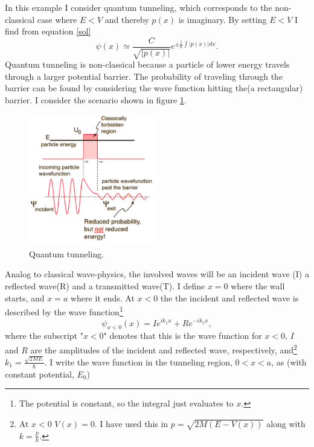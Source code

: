 \begin{example}
	In this example I consider quantum tunneling, which corresponds to the non-classical case where $E<V$ and thereby $p(x)$ is imaginary. By setting $E<V$ I find from equation \eqref{sol}
	\begin{equation}
		\psi(x)\simeq\frac{C}{\sqrt{|p(x)|}}e^{\pm\frac{1}{\hbar}\int |p(x)|dx}.
		\label{sol7}
	\end{equation} 
	Quantum tunneling is non-classical because a particle of lower energy travels through a larger potential barrier. The probability of traveling through the barrier can be found by considering the wave function hitting the(a rectangular) barrier. I consider the scenario shown in figure \ref{fig:wkb2}.
	\begin{figure}[H]
		\captionsetup{width=1\textwidth}
		\centering
		\includegraphics[width=0.5\textwidth]{figures/wkb2}
		\caption{Quantum tunneling.}
		\label{fig:wkb2}
	\end{figure}
	Analog to classical wave-physics, the involved waves will be an incident wave (I) a reflected wave(R) and a transmitted wave(T). I define $x=0$ where the wall starts, and $x=a$ where it ends. At $x<0$ the the incident and reflected wave is described by the wave function\footnote{The potential is constant, so the integral just evaluates to $x$.}
	\begin{equation}
		\psi_{x<0}(x)=Ie^{ik_1x}+Re^{-ik_1x},
	\end{equation} 
	where the subscript "$x<0$" denotes that this is the wave function for $x<0$, $I$ and $R$ are the amplitudes of the incident and reflected wave, respectively, and\footnote{At $x<0$ $V(x)=0$. I have used this in $p=\sqrt{2M(E-V(x))}$  along with $k=\frac{p}{\hbar}$.} $k_1=\frac{\sqrt{2ME}}{\hbar}$. I write the wave function in the tunneling region, $0<x<a$, as (with constant potential, $E_0$)
	\begin{equation}

\end{equation}
\end{example}
